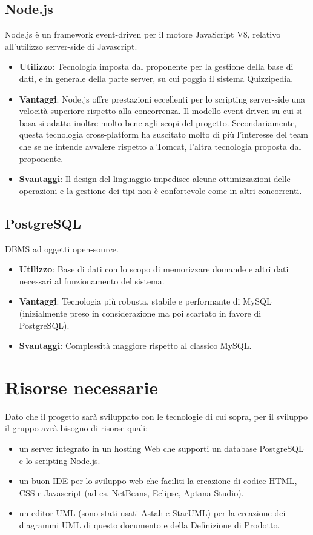 \rigaregistro{0.0.17}{Luca Alessio (Progettista)}{12/05/2016}{Termine stesura sezione diagrammi e revisione/ampliamento di vari paragrafi}\documentclass[a4paper,11pt]{article}
\begin{document}
	\subsection{Node.js}
	 Node.js è un framework event-driven per il motore JavaScript V8, relativo all'utilizzo server-side di Javascript.
	\begin{itemize}
		\item\textbf{Utilizzo}: Tecnologia imposta dal proponente per la gestione della base di dati, e in generale della parte server, su cui poggia il sistema Quizzipedia.
		\item\textbf{Vantaggi}: Node.js offre prestazioni eccellenti per lo scripting server-side una velocità superiore rispetto alla concorrenza. Il modello event-driven su cui si basa si adatta inoltre molto bene agli scopi del progetto. Secondariamente, questa tecnologia cross-platform ha suscitato molto di più l'interesse del team che se ne intende avvalere rispetto a Tomcat, l'altra tecnologia proposta dal proponente.
		\item\textbf{Svantaggi}: Il design del linguaggio impedisce alcune ottimizzazioni delle operazioni e la gestione dei tipi non è confortevole come in altri concorrenti.
	\end{itemize}
	\subsection{PostgreSQL}
	DBMS ad oggetti open-source.
	\begin{itemize}
		\item\textbf{Utilizzo}: Base di dati con lo scopo di memorizzare domande e altri dati necessari al funzionamento del sistema.
		\item\textbf{Vantaggi}: Tecnologia più robusta, stabile e performante di MySQL (inizialmente preso in considerazione ma poi scartato in favore di PostgreSQL).
		\item\textbf{Svantaggi}: Complessità maggiore rispetto al classico MySQL.
	\end{itemize}
	\newpage
	
	\section{Risorse necessarie}
	Dato che il progetto sarà sviluppato con le tecnologie di cui sopra, per il sviluppo il gruppo avrà bisogno di risorse quali:
	\begin{itemize}
	\item un server integrato in un hosting Web che supporti un database PostgreSQL e lo scripting Node.js.
	\item un buon IDE per lo sviluppo web che faciliti la creazione di codice HTML, CSS e Javascript (ad es. NetBeans, Eclipse, Aptana Studio).
	\item un editor UML (sono stati usati Astah e StarUML) per la creazione dei diagrammi UML  di questo documento e della Definizione di Prodotto.
	\end{itemize}
	\newpage
	
\end{document}

